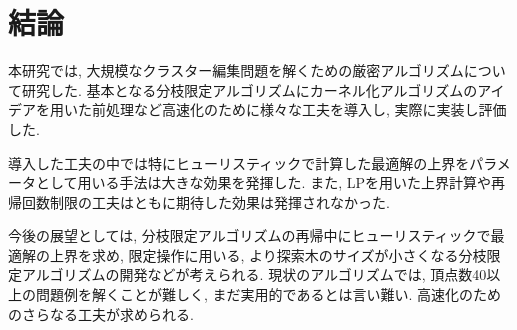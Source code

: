 \documentclass[10.5,a4paper,titlepage, dvipdfmx]{bxjsarticle}
\begin{document}
\section{結論}
本研究では, 大規模なクラスター編集問題を解くための厳密アルゴリズムについて研究した.
基本となる分枝限定アルゴリズムにカーネル化アルゴリズムのアイデアを用いた前処理など高速化のために様々な工夫を導入し, 実際に実装し評価した.\par
導入した工夫の中では特にヒューリスティックで計算した最適解の上界をパラメータとして用いる手法は大きな効果を発揮した.
また, LPを用いた上界計算や再帰回数制限の工夫はともに期待した効果は発揮されなかった.\par
今後の展望としては, 分枝限定アルゴリズムの再帰中にヒューリスティックで最適解の上界を求め, 限定操作に用いる, より探索木のサイズが小さくなる分枝限定アルゴリズムの開発などが考えられる.
現状のアルゴリズムでは, 頂点数40以上の問題例を解くことが難しく, まだ実用的であるとは言い難い.
高速化のためのさらなる工夫が求められる.
\clearpage
\end{document}
